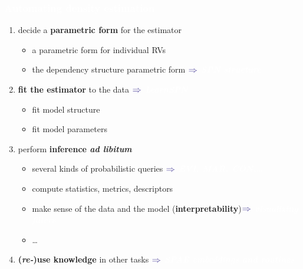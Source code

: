 \documentclass[xcolor={usenames,dvipsnames,svgnames}, compress]{beamer}
\newcommand{\highlighttext}[2][yellow]{{\colorbox{#1}{\textcolor{white}{#2}}}}
\begin{document}
\begin{frame}[t]
  \frametitle{\highlighttext[bgrey2]{Automating density estimation}}
  \footnotesize
  
  \begin{enumerate}
    \setlength{\itemindent}{0pt}
  \item decide a \textbf{parametric form} for the estimator
    \begin{itemize}
      \setlength{\itemindent}{-10pt}
      \scriptsize
    \item  a parametric form for individual RVs 
\item the dependency structure parametric form
  \hfill$\color{violet}\boldsymbol\Rightarrow$
  {\scriptsize\highlighttext[tomato0]{\emph{\textbf{SPN structure}}}} 
    \end{itemize}
  \item \textbf{fit the estimator} to the data  \hfill$\color{violet}\boldsymbol\Rightarrow$
  {\scriptsize\highlighttext[tomato4]{\emph{\textbf{LearnSPN}}}} 
    \begin{itemize}
      \setlength{\itemindent}{-10pt}
      \scriptsize
    \item fit model structure
      \item fit model parameters
    \end{itemize}
  \item perform \textbf{inference \emph{ad libitum}}
    \begin{itemize}\scriptsize
      \setlength{\itemindent}{-10pt}
    \item several kinds of probabilistic queries \hfill$\color{violet}\boldsymbol\Rightarrow$
  {\scriptsize\highlighttext[tomato4]{\emph{\textbf{EVI, MAR, CON,\dots}}}} 
    \item compute statistics, metrics, descriptors
      \item make sense of the data and the model (\textbf{interpretability})\hfill$\color{violet}\boldsymbol\Rightarrow$
  {\scriptsize\highlighttext[tomato4]{\emph{\textbf{visualizing
          filters}}}} 
      \item\dots
    \end{itemize}
  

    \item \textbf{(\emph{re-})use knowledge} in other tasks \hfill$\color{violet}\boldsymbol\Rightarrow$
  {\scriptsize\highlighttext[tomato4]{\emph{\textbf{SPAE embeddings
          and routines}}}} 
  \end{enumerate}
\end{frame}
\end{document}
